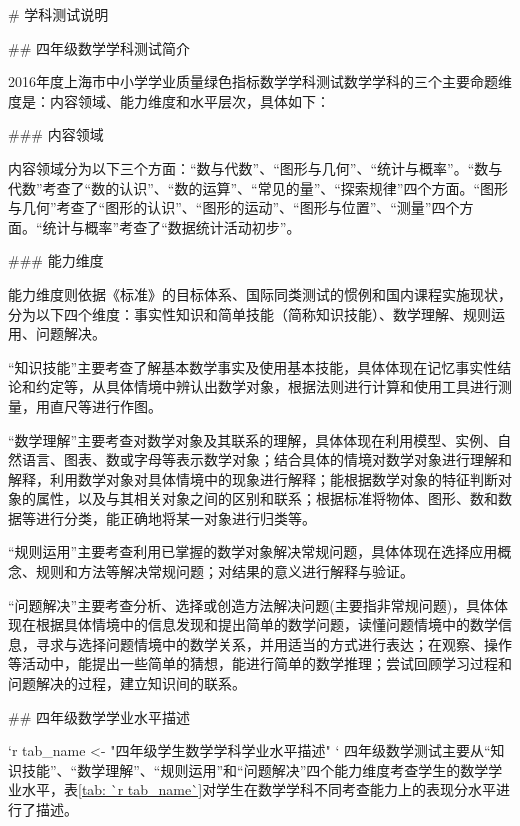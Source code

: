 # 学科测试说明

## 四年级数学学科测试简介

2016年度上海市中小学学业质量绿色指标数学学科测试数学学科的三个主要命题维度是：内容领域、能力维度和水平层次，具体如下：

### 内容领域

内容领域分为以下三个方面：“数与代数”、“图形与几何”、“统计与概率”。“数与代数”考查了“数的认识”、“数的运算”、“常见的量”、“探索规律”四个方面。“图形与几何”考查了“图形的认识”、“图形的运动”、“图形与位置”、“测量”四个方面。“统计与概率”考查了“数据统计活动初步”。

### 能力维度

能力维度则依据《标准》的目标体系、国际同类测试的惯例和国内课程实施现状，分为以下四个维度：事实性知识和简单技能（简称知识技能）、数学理解、规则运用、问题解决。

“知识技能”主要考查了解基本数学事实及使用基本技能，具体体现在记忆事实性结论和约定等，从具体情境中辨认出数学对象，根据法则进行计算和使用工具进行测量，用直尺等进行作图。

“数学理解”主要考查对数学对象及其联系的理解，具体体现在利用模型、实例、自然语言、图表、数或字母等表示数学对象；结合具体的情境对数学对象进行理解和解释，利用数学对象对具体情境中的现象进行解释；能根据数学对象的特征判断对象的属性，以及与其相关对象之间的区别和联系；根据标准将物体、图形、数和数据等进行分类，能正确地将某一对象进行归类等。

“规则运用”主要考查利用已掌握的数学对象解决常规问题，具体体现在选择应用概念、规则和方法等解决常规问题；对结果的意义进行解释与验证。

“问题解决”主要考查分析、选择或创造方法解决问题(主要指非常规问题)，具体体现在根据具体情境中的信息发现和提出简单的数学问题，读懂问题情境中的数学信息，寻求与选择问题情境中的数学关系，并用适当的方式进行表达；在观察、操作等活动中，能提出一些简单的猜想，能进行简单的数学推理；尝试回顾学习过程和问题解决的过程，建立知识间的联系。

## 四年级数学学业水平描述

`r tab_name <- "四年级学生数学学科学业水平描述" `
四年级数学测试主要从“知识技能”、“数学理解”、“规则运用”和“问题解决”四个能力维度考查学生的数学学业水平，表\ref{tab: `r tab_name`}对学生在数学学科不同考查能力上的表现分水平进行了描述。


